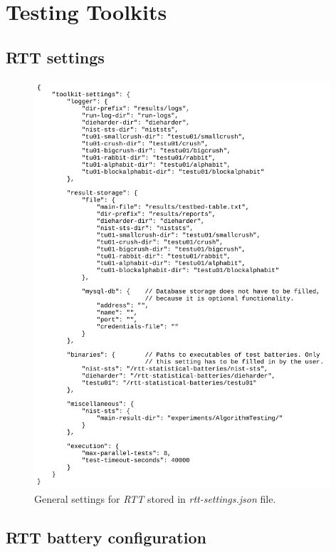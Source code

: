 \documentclass[
  digital,     %
  oneside,     %
  nosansbold,  %
  nocolorbold, %
  nolof,         %
  nolot,         %
]{fithesis4}
\begin{document}
\chapter{Testing Toolkits} \label{append:rtt}

\section{RTT settings} \label{append:rtt-setting}

\begin{figure}[H]
  \begin{center}
    \includegraphics[width=11cm]{figures/rtt/rtt-settings.jpg}
  \end{center}
  \caption{General settings for \emph{RTT} stored in \emph{rtt-settings.json} file.}
  \label{fig:rtt_settings}
\end{figure}



\section{RTT battery configuration} \label{append:rtt-config}
\end{document}
